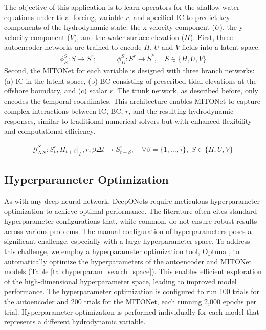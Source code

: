 \documentclass[draft]{agujournal2019}
\begin{document}
The objective of this application is to learn operators for the shallow water equations under tidal forcing, variable $r$, and specified IC to predict key components of the hydrodynamic state: the x-velocity component ($U$), the y-velocity component ($V$), and the water surface elevation ($H$). First, three autoencoder networks are trained to encode $H$, $U$ and $V$ fields into a latent space. 
\begin{align}
\phi_E^S: S \rightarrow S^r; &\qquad \phi_D^S: S^r \rightarrow S^*, \quad S \in \{H,U,V \}
\label{eq:AE_setup}
\end{align}
Second, the MITONet for each variable is designed with three branch networks: (a) IC in the latent space, (b) BC consisting of prescribed tidal elevations at the offshore boundary, and (c) scalar $r$. The trunk network, as described before, only encodes the temporal coordinates. This architecture enables MITONet to capture complex interactions between IC, BC, $r$, and the resulting hydrodynamic responses, similar to traditional numerical solvers but with enhanced flexibility and computational efficiency.

\begin{align}
\mathcal{G}_{NN}^S: S^r_t, H_{t+\beta}\vert_{\Gamma}, r,\beta \Delta t  \rightarrow S^r_{t+\beta}, \quad \forall \beta=\{1,\ldots,\tau\}, \; S \in \{H,U,V \}
\label{eq:MITONet_setup}
\end{align}

\subsection{Hyperparameter Optimization}

As with any deep neural network, DeepONets require meticulous hyperparameter optimization to achieve optimal performance. The literature often cites standard hyperparameter configurations that, while common, do not ensure robust results across various problems. The manual configuration of hyperparameters poses a significant challenge, especially with a large hyperparameter space. To address this challenge,  we employ a hyperparameter optimization tool, Optuna \cite{akiba2019optuna}, to automatically optimize the hyperparameters of the autoencoder and MITONet models (Table \ref{tab:hyperparam_search_space}). This enables efficient exploration of the high-dimensional hyperparameter space, leading to improved model performance. The hyperparameter optimization is configured to run 100 trials for the autoencoder and 200 trials for the MITONet, each running 2,000 epochs per trial. Hyperparameter optimization is performed individually for each model that represents a different hydrodynamic variable.
\end{document}
